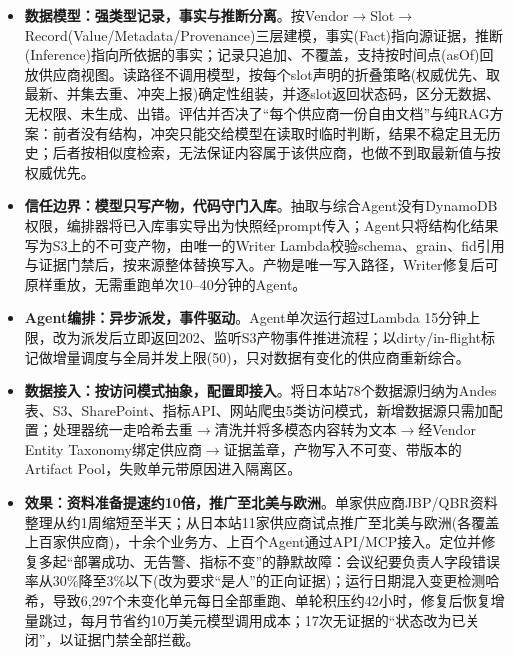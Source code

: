 \documentclass{resume}
\begin{document}
\begin{onehalfspacing}
\begin{itemize}
    \item \textbf{数据模型：强类型记录，事实与推断分离}。按Vendor$\rightarrow$Slot$\rightarrow$Record(Value/Metadata/Provenance)三层建模，事实(Fact)指向源证据，推断(Inference)指向所依据的事实；记录只追加、不覆盖，支持按时间点(asOf)回放供应商视图。读路径不调用模型，按每个slot声明的折叠策略(权威优先、取最新、并集去重、冲突上报)确定性组装，并逐slot返回状态码，区分无数据、无权限、未生成、出错。评估并否决了“每个供应商一份自由文档”与纯RAG方案：前者没有结构，冲突只能交给模型在读取时临时判断，结果不稳定且无历史；后者按相似度检索，无法保证内容属于该供应商，也做不到取最新值与按权威优先。
    \item \textbf{信任边界：模型只写产物，代码守门入库}。抽取与综合Agent没有DynamoDB权限，编排器将已入库事实导出为快照经prompt传入；Agent只将结构化结果写为S3上的不可变产物，由唯一的Writer Lambda校验schema、grain、fid引用与证据门禁后，按来源整体替换写入。产物是唯一写入路径，Writer修复后可原样重放，无需重跑单次10--40分钟的Agent。
    \item \textbf{Agent编排：异步派发，事件驱动}。Agent单次运行超过Lambda 15分钟上限，改为派发后立即返回202、监听S3产物事件推进流程；以dirty/in-flight标记做增量调度与全局并发上限(50)，只对数据有变化的供应商重新综合。
    \item \textbf{数据接入：按访问模式抽象，配置即接入}。将日本站78个数据源归纳为Andes表、S3、SharePoint、指标API、网站爬虫5类访问模式，新增数据源只需加配置；处理器统一走哈希去重$\rightarrow$清洗并将多模态内容转为文本$\rightarrow$经Vendor Entity Taxonomy绑定供应商$\rightarrow$证据盖章，产物写入不可变、带版本的Artifact Pool，失败单元带原因进入隔离区。
    \item \textbf{效果：资料准备提速约10倍，推广至北美与欧洲}。单家供应商JBP/QBR资料整理从约1周缩短至半天；从日本站11家供应商试点推广至北美与欧洲(各覆盖上百家供应商)，十余个业务方、上百个Agent通过API/MCP接入。定位并修复多起“部署成功、无告警、指标不变”的静默故障：会议纪要负责人字段错误率从30\%降至3\%以下(改为要求“是人”的正向证据)；运行日期混入变更检测哈希，导致6,297个未变化单元每日全部重跑、单轮积压约42小时，修复后恢复增量跳过，每月节省约10万美元模型调用成本；17次无证据的“状态改为已关闭”，以证据门禁全部拦截。
\end{itemize}
\end{onehalfspacing}
\end{document}
